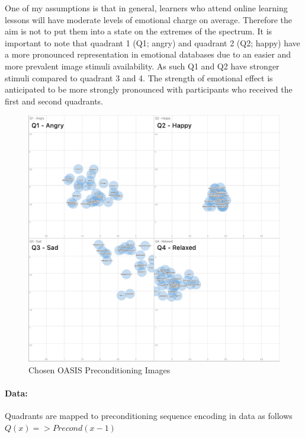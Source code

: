 One of my assumptions is that in general, learners who attend online learning lessons will have moderate levels of emotional charge on average. Therefore the aim is not to put them into a state on the extremes of the spectrum. It is important to note that quadrant 1 (Q1; angry) and quadrant 2 (Q2; happy) have a more pronounced representation in emotional databases due to an easier and more prevalent image stimuli availability. As such Q1 and Q2 have stronger stimuli compared to quadrant 3 and 4. The strength of emotional effect is anticipated to be more strongly pronounced with participants who received the first and second quadrants.







\begin{figure}[h!]
	\centering
	\includegraphics[width=1\linewidth]{graphics/All_Preconditionings}
	\caption{Chosen OASIS Preconditioning Images}
	\label{fig:allpreconditionings}
\end{figure}


\paragraph{Data:} Quadrants are mapped to preconditioning sequence encoding in data as follows \(Q(x) => Precond(x-1)\)